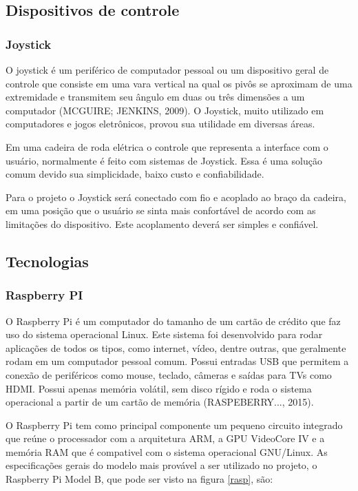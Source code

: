 \subsection{Dispositivos de controle}

\subsubsection{Joystick}

O joystick é um periférico de computador pessoal ou um dispositivo geral de controle que consiste em uma vara vertical na qual os pivôs se aproximam de uma extremidade e transmitem seu ângulo em duas ou três dimensões a um computador (MCGUIRE; JENKINS, 2009). O Joystick, muito utilizado em computadores e jogos eletrônicos, provou sua utilidade em diversas áreas.

Em uma cadeira de roda elétrica o controle que representa a interface com o usuário, normalmente é feito com sistemas de Joystick. Essa é uma solução comum devido sua simplicidade, baixo custo e confiabilidade.

Para o projeto o Joystick será conectado com fio e acoplado ao braço da cadeira, em uma posição que o usuário se sinta mais confortável de acordo com as limitações do dispositivo. Este acoplamento deverá ser simples e confiável.


\subsection{Tecnologias}
\label{subsec:tecnologias}
\subsubsection{Raspberry PI}


O Raspberry Pi é um computador do tamanho de um cartão de crédito que faz uso do sistema operacional Linux. Este sistema foi desenvolvido para rodar aplicações de todos os tipos, como internet, vídeo, dentre outras, que geralmente rodam em um computador pessoal comum. Possui entradas USB que permitem a conexão de periféricos como mouse, teclado, câmeras e saídas para TVs como HDMI. Possui apenas memória volátil, sem disco rígido e roda o sistema operacional a partir de um cartão de memória (RASPEBERRY..., 2015).

O Raspberry Pi tem como principal componente um pequeno circuito integrado que reúne o processador com a arquitetura ARM, a GPU VideoCore IV e a memória RAM que é compativel com o sistema operacional GNU/Linux. As especificações gerais do modelo mais provável a ser utilizado no projeto, o Raspberry Pi Model B, que pode ser visto na figura \ref{rasp}, são:

